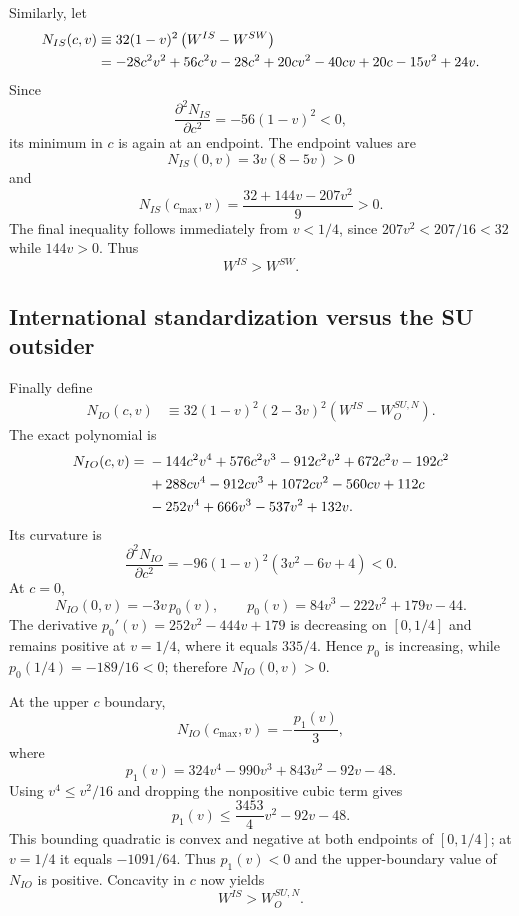 Similarly, let
\begin{align}
N_{IS}(c,v)
&\equiv 32(1-v)^2\left(W^{IS}-W^{SW}\right)\notag\\
&=-28c^2v^2+56c^2v-28c^2
+20cv^2-40cv+20c
-15v^2+24v.
\label{eq:appendix-n-is}
\end{align}
Since
\[
\frac{\partial^2N_{IS}}{\partial c^2}
=-56(1-v)^2<0,
\]
its minimum in $c$ is again at an endpoint. The endpoint values are
\[
N_{IS}(0,v)=3v(8-5v)>0
\]
and
\[
N_{IS}(c_{\max},v)
=\frac{32+144v-207v^2}{9}>0.
\]
The final inequality follows immediately from $v<1/4$, since $207v^2<207/16<32$ while $144v>0$. Thus
\begin{equation}
\boxed{W^{IS}>W^{SW}.}
\label{eq:appendix-is-gt-sw}
\end{equation}

\subsection{International standardization versus the SU outsider}

Finally define
\begin{align}
N_{IO}(c,v)
&\equiv 32(1-v)^2(2-3v)^2
\left(W^{IS}-W_O^{SU,N}\right).
\label{eq:appendix-n-io-definition}
\end{align}
The exact polynomial is
\begin{align}
N_{IO}(c,v)
={}&-144c^2v^4+576c^2v^3-912c^2v^2+672c^2v-192c^2\notag\\
&+288cv^4-912cv^3+1072cv^2-560cv+112c\notag\\
&-252v^4+666v^3-537v^2+132v.
\label{eq:appendix-n-io}
\end{align}
Its curvature is
\[
\frac{\partial^2N_{IO}}{\partial c^2}
=-96(1-v)^2(3v^2-6v+4)<0.
\]
At $c=0$,
\[
N_{IO}(0,v)
=-3v\,p_0(v),
\qquad
p_0(v)=84v^3-222v^2+179v-44.
\]
The derivative $p_0'(v)=252v^2-444v+179$ is decreasing on $[0,1/4]$ and remains positive at $v=1/4$, where it equals $335/4$. Hence $p_0$ is increasing, while $p_0(1/4)=-189/16<0$; therefore $N_{IO}(0,v)>0$.

At the upper $c$ boundary,
\[
N_{IO}(c_{\max},v)
=-\frac{p_1(v)}{3},
\]
where
\[
p_1(v)=324v^4-990v^3+843v^2-92v-48.
\]
Using $v^4\le v^2/16$ and dropping the nonpositive cubic term gives
\[
p_1(v)
\le \frac{3453}{4}v^2-92v-48.
\]
This bounding quadratic is convex and negative at both endpoints of $[0,1/4]$; at $v=1/4$ it equals $-1091/64$. Thus $p_1(v)<0$ and the upper-boundary value of $N_{IO}$ is positive. Concavity in $c$ now yields
\begin{equation}
\boxed{W^{IS}>W_O^{SU,N}.}
\label{eq:appendix-is-gt-su-outsider}
\end{equation}

